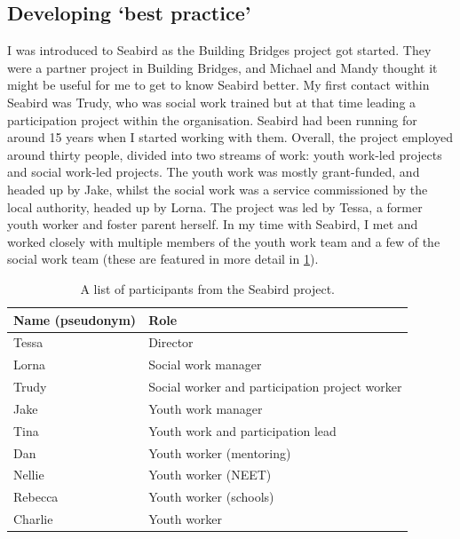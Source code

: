 \subsection{Developing `best practice'}
\label{subsec:4-seabird}
I was introduced to Seabird as the Building Bridges project got started. They were a partner project in Building Bridges, and Michael and Mandy thought it might be useful for me to get to know Seabird better. My first contact within Seabird was Trudy, who was social work trained but at that time leading a participation project within the organisation. Seabird had been running for around 15 years when I started working with them. Overall, the project employed around thirty people, divided into two streams of work: youth work-led projects and social work-led projects. The youth work was mostly grant-funded, and headed up by Jake, whilst the social work was a service commissioned by the local authority, headed up by Lorna. The project was led by Tessa, a former youth worker and foster parent herself. In my time with Seabird, I met and worked closely with multiple members of the youth work team and a few of the social work team (these are featured in more detail in \ref{tab:seabird-participants}). 

\begin{table}[hbt!]
\centering
\begin{tabular}{|l|l|} \hline 
\textbf{Name (pseudonym)} & \textbf{Role}                    \\ \hline 
Tessa& Director\\ \hline 
Lorna& Social work manager\\ \hline 
Trudy& Social worker and participation project worker\\\hline
 Jake&Youth work manager\\ \hline 
Tina&Youth work and participation lead\\\hline
 Dan&Youth worker (mentoring)\\\hline Nellie&Youth worker (NEET)\\
 \hline Rebecca&Youth worker (schools)\\\hline
 Charlie& Youth worker\\ \hline\end{tabular}

\caption{A list of participants from the Seabird project.}
\label{tab:seabird-participants}
\end{table}

